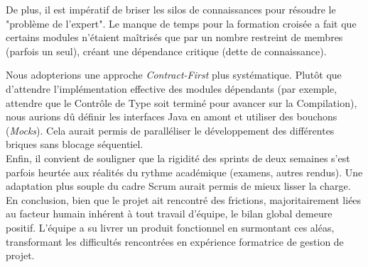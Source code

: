 De plus, il est impératif de briser les silos de connaissances pour résoudre le "problème de l'expert". Le manque de temps pour la formation croisée a fait que certains modules n'étaient maîtrisés que par un nombre restreint de membres (parfois un seul), créant une dépendance critique (dette de connaissance).
\newline

Nous adopterions une approche \textit{Contract-First} plus systématique. Plutôt que d'attendre l'implémentation effective des modules dépendants (par exemple, attendre que le Contrôle de Type soit terminé pour avancer sur la Compilation), nous aurions dû définir les interfaces Java en amont et utiliser des bouchons (\textit{Mocks}). Cela aurait permis de paralléliser le développement des différentes briques sans blocage séquentiel.\\

Enfin, il convient de souligner que la rigidité des sprints de deux semaines s'est parfois heurtée aux réalités du rythme académique (examens, autres rendus). Une adaptation plus souple du cadre Scrum aurait permis de mieux lisser la charge. En conclusion, bien que le projet ait rencontré des frictions, majoritairement liées au facteur humain inhérent à tout travail d'équipe, le bilan global demeure positif. L'équipe a su livrer un produit fonctionnel en surmontant ces aléas, transformant les difficultés rencontrées en expérience formatrice de gestion de projet.\\